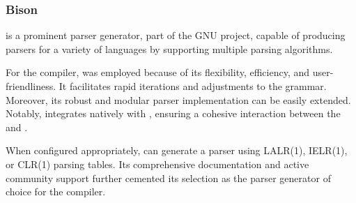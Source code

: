 \subsubsection{Bison}

\parserGen{} is a prominent parser generator, part of the GNU project, capable of
producing parsers for a variety of languages by supporting multiple parsing
algorithms\cite{BISON}. 

For the \lang{} compiler, \parserGen{} was employed because of its flexibility,
efficiency, and user-friendliness. It facilitates rapid iterations and adjustments to
the grammar. Moreover, its robust and modular parser implementation can be easily
extended. Notably, \parserGen{} integrates natively with \lexerGen{}, ensuring a
cohesive interaction between the \lexer{} and \parser{}.

When configured appropriately, \parserGen{} can generate a \textit{\parserType{}}
parser using LALR(1), IELR(1), or CLR(1) parsing tables. Its comprehensive
documentation and active community support further cemented its selection as the
parser generator of choice for the \lang{} compiler.

